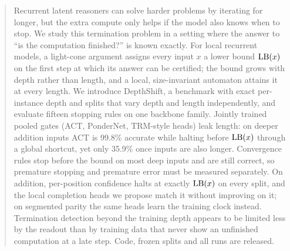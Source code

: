 \begin{abstract}
Recurrent latent reasoners can solve harder problems by iterating for longer, but the extra compute
only helps if the model also knows when to stop. We study this termination problem in a setting where
the answer to ``is the computation finished?'' is known exactly. For local recurrent models, a
light-cone argument assigns every input $x$ a lower bound $\LB(x)$ on the first step at which its answer
can be certified; the bound grows with depth rather than length, and a local, size-invariant automaton
attains it at every length. We introduce DepthShift, a benchmark with exact per-instance depth and
splits that vary depth and length independently, and evaluate fifteen stopping rules on one backbone
family. Jointly trained pooled gates (ACT, PonderNet, TRM-style heads) leak length: on deeper addition
inputs ACT is 99.8\% accurate while halting before $\LB(x)$ through a global shortcut, yet only 35.9\%
once inputs are also longer. Convergence rules stop before the bound on most deep inputs and are still
correct, so premature stopping and premature error must be measured separately. On addition,
per-position confidence halts at exactly $\LB(x)$ on every split, and the local completion heads we
propose match it without improving on it; on segmented parity the same heads learn the training clock
instead. Termination detection beyond the training depth appears to be limited less by the readout than
by training data that never show an unfinished computation at a late step. Code, frozen splits and all
runs are released.
\end{abstract}
